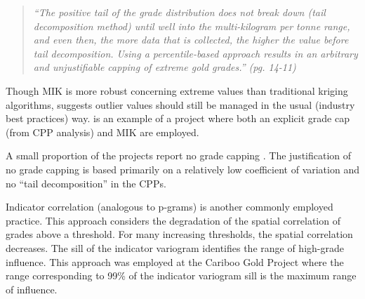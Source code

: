 \blockquote{\textit{``The positive tail of the grade distribution does
        not break down (tail decomposition method) until well into the multi-kilogram per tonne range, and even then, the more data that is collected, the higher the value before tail decomposition. Using a percentile-based approach results in an arbitrary and unjustifiable capping of extreme gold grades.'' (pg. 14-11)}}

Though \gls{MIK} is more robust concerning extreme values than traditional kriging algorithms, \cite{carvalho2017overview} suggests outlier values should still be managed in the usual (industry best practices) way. \cite{artemis2020} is an example of a project where both an explicit grade cap (from \gls{CPP} analysis) and \gls{MIK} are employed.

A small proportion of the projects report no grade capping \citep{medgold2021,pasofino2020,eldorado2020}. The justification of no grade capping is based primarily on a relatively low coefficient of variation and no ``tail decomposition'' in the \glspl{CPP}.


Indicator correlation (analogous to p-grams) is another commonly employed practice. This approach considers the degradation of the spatial correlation of grades above a threshold. For many increasing thresholds, the spatial correlation decreases. The sill of the indicator variogram identifies the range of high-grade influence. This approach was employed at the Cariboo Gold Project \citep{osiko2020} where the range corresponding to 99\% of the indicator variogram sill is the maximum range of influence.


